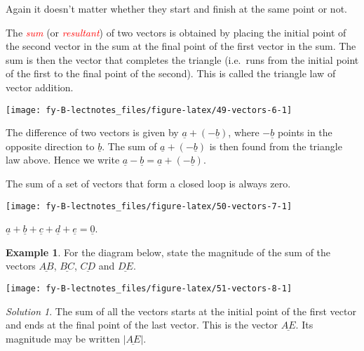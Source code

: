 \documentclass[
  11pt,
  oneside]{book}
\newcommand{\slide}{}
\theoremstyle{definition}
\theoremstyle{definition}
\newtheorem{example}{Example}[chapter]
\theoremstyle{definition}
\theoremstyle{definition}
\theoremstyle{remark}
\newtheorem*{solution}{Solution}
\begin{document}
Again it doesn't matter whether they start and finish at the same point or not.

The \textcolor{red}{\em sum} (or \textcolor{red}{\em resultant}) of two vectors is obtained by placing the initial point of the second vector in the sum at the final point of the first vector in the sum. The sum is then the vector that completes the triangle (i.e.~runs from the initial point of the first to the final point of the second). This is called the triangle law of vector addition.

\begin{center}\texttt{[image: fy-B-lectnotes\_files/figure-latex/49-vectors-6-1]} \end{center}

The difference of two vectors is given by \(\underline a + (-\underline b)\), where \(-\underline b\) points in the opposite direction to \(\underline b\). The sum of \(\underline a + (-\underline b)\) is then found from the triangle law above. Hence we write \(\underline a-\underline b = \underline a + (-\underline b)\).

The sum of a set of vectors that form a closed loop is always zero.

\begin{center}\texttt{[image: fy-B-lectnotes\_files/figure-latex/50-vectors-7-1]} \end{center}

\(\underline a + \underline b + \underline c + \underline d + \underline e = \underline 0\).

\slide

\begin{example}

For the diagram below, state the magnitude of the sum of the vectors \(\underline{AB}\), \(\underline{BC}\), \(\underline{CD}\) and \(\underline{DE}\).

\begin{center}\texttt{[image: fy-B-lectnotes\_files/figure-latex/51-vectors-8-1]} \end{center}

\end{example}

\begin{solution}
The sum of all the vectors starts at the initial point of the first vector and ends at the final point of the last vector. This is the vector \(\underline{AE}\). Its magnitude may be written \(|\underline{AE}|\).
\end{solution}
\end{document}

